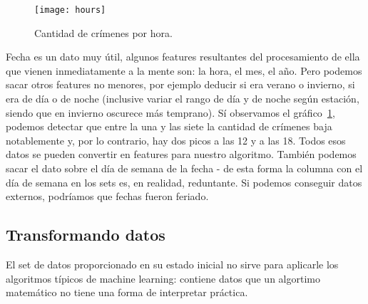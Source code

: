 \begin{figure}[H]
\texttt{[image: hours]}
\caption{Cantidad de crímenes por hora.}
\label{fig:hours}
\end{figure}

Fecha es un dato muy útil, algunos features resultantes del procesamiento de ella que vienen inmediatamente a la mente son: la hora, el mes, el año. Pero podemos sacar otros features no menores, por ejemplo deducir si era verano o invierno, si era de día o de noche (inclusive variar el rango de día y de noche según estación, siendo que en invierno oscurece más temprano). Sí observamos el gráfico~\ref{fig:hours}, podemos detectar que entre la una y las siete la cantidad de crímenes baja notablemente y, por lo contrario, hay dos picos a las 12 y a las 18. Todos esos datos se pueden convertir en features para nuestro algoritmo. También podemos sacar el dato sobre el día de semana de la fecha - de esta forma la columna con el día de semana en los sets es, en realidad, reduntante. Si podemos conseguir datos externos, podríamos que fechas fueron feriado.






\subsection{Transformando datos} %
\label{sub:transformando_datos}

El set de datos proporcionado en su estado inicial no sirve para aplicarle los algoritmos típicos de machine learning: contiene datos que un algortimo matemático no tiene una forma de interpretar práctica.

